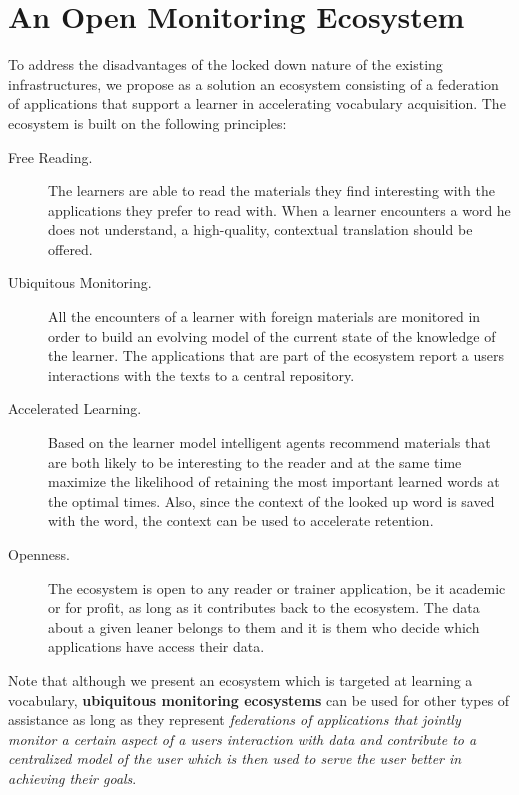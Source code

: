 

\section {An Open Monitoring Ecosystem}

To address the disadvantages of the locked down nature of the existing infrastructures, we propose as a solution an ecosystem consisting of a federation of applications that support a learner in accelerating vocabulary acquisition. The ecosystem is built on the following principles:

\begin{description}

	\item [Free Reading.] The learners are able to read the materials they find interesting with the applications they prefer to read with. When a learner encounters a word he does not understand, a high-quality, contextual translation should be offered.

	\item [Ubiquitous Monitoring.] All the encounters of a learner with foreign materials are monitored in order to build an evolving model of the current state of the knowledge of the learner. The applications that are part of the ecosystem report a users interactions with the texts to a central repository.

	\item [Accelerated Learning.] Based on the learner model intelligent agents recommend materials that are both likely to be interesting to the reader and at the same time maximize the likelihood of retaining the most important learned words at the optimal times. Also, since the context of the looked up word is saved with the word, the context can be used to accelerate retention.

	\item [Openness.] The ecosystem is open to any reader or trainer application, be it academic or for profit, as long as it contributes back to the ecosystem. The data about a given leaner belongs to them and it is them who decide which applications have access their data.

\end{description}

Note that although we present an ecosystem which is targeted at learning a vocabulary, {\bf ubiquitous monitoring ecosystems} can be used for other types of assistance as long as they represent {\em federations of applications that jointly monitor a certain aspect of a users interaction with data and contribute to a centralized model of the user which is then used to serve the user better in achieving their goals}.


